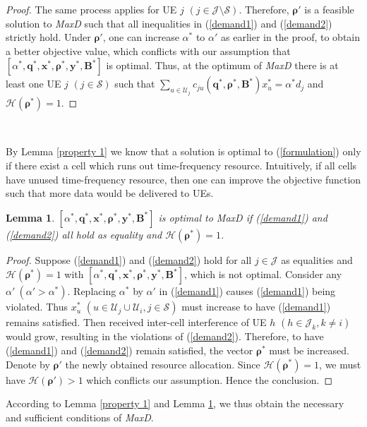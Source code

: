 \documentclass[10pt,journal,final,finalsubmission,twocolumn]{IEEEtran}
\newtheorem{lemma}[theorem]{Lemma}
\begin{document}
\begin{proof}
The same process applies for UE $j$ $(j\in \mathcal{J}\setminus\mathcal{S})$. Therefore, $\boldsymbol{\rho}'$ is a feasible solution to {\em MaxD} such that all inequalities in (\ref{demand1}) and (\ref{demand2}) strictly hold. Under $\boldsymbol{\rho}'$, one can increase $\alpha^*$ to $\alpha '$ as earlier in the proof, to obtain a better objective value, which conflicts with our assumption that $[\alpha ^*, \boldsymbol{q}^*,\boldsymbol{x}^*,\boldsymbol{\rho}^*, \boldsymbol{y}^*,\boldsymbol{B}^*]$ is optimal.
Thus, at the optimum of {\em MaxD} there is at least one UE $j$ $(j\in \mathcal{S})$ such that $\sum_{u\in \mathcal{U}_j} c_{ju}\left (\boldsymbol{q}^*,\boldsymbol{ \rho}^*, \boldsymbol{B}^*\right )x_u^*= \alpha^* d_j$ and $\mathcal{H}(\boldsymbol{\rho^*}) = 1$.
\end{proof}
\

By Lemma \ref{property 1} we know that a solution is optimal to (\ref{formulation}) only if there exist a cell which runs out time-frequency resource. Intuitively, if all cells have unused time-frequency resource, then one can improve the objective function such that more data would be delivered to UEs. 


\begin{lemma}\label{property 2}
$[\alpha ^*, \boldsymbol{q}^*,\boldsymbol{x}^*,\boldsymbol{\rho}^*, \boldsymbol{y}^*,\boldsymbol{B}^*]$ is optimal to MaxD if (\ref{demand1}) and (\ref{demand2}) all hold as equality and $\mathcal{H}(\boldsymbol{\rho^*}) = 1$.
\end{lemma}
\begin{proof}
Suppose (\ref{demand1}) and (\ref{demand2}) hold for all $j\in \mathcal{J}$ as equalities and  $\mathcal{H}(\boldsymbol{\rho^*}) = 1$ with $[\alpha ^*, \boldsymbol{q}^*,\boldsymbol{x}^*,\boldsymbol{\rho}^*, \boldsymbol{y}^*,\boldsymbol{B}^*]$, which is not optimal. Consider any $\alpha ' \ (\alpha' > \alpha^*)$. Replacing $\alpha^*$ by $\alpha '$ in (\ref{demand1}) causes (\ref{demand1}) being violated. Thus $x_u^*$ $(u\in \mathcal{U}_j\cup \mathcal{U}_i, j\in \mathcal{S})$ must increase to have (\ref{demand1}) remains satisfied. Then received inter-cell interference of UE $h$ $(h\in \mathcal{J}_k,k\neq i)$ would grow, resulting in the violations of (\ref{demand2}). Therefore, to have (\ref{demand1}) and (\ref{demand2}) remain satisfied, the vector $\boldsymbol{\rho}^*$ must be increased. Denote by $\boldsymbol{\rho}'$ the newly obtained resource allocation. Since $\mathcal{H}(\boldsymbol{\rho}^*) = 1$, we must have $\mathcal{H}(\boldsymbol{\rho}') > 1$ which conflicts our assumption. Hence the conclusion.
\end{proof}
According to Lemma \ref{property 1} and Lemma \ref{property 2}, we thus obtain the necessary and sufficient conditions of {\em MaxD}.
\end{document}
